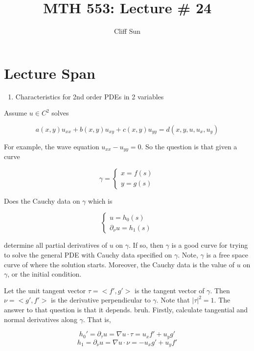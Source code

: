 \documentclass{article}
\title{MTH 553: Lecture \# 24}
\author{Cliff Sun}
\newtheorem{one minute paper}[theorem]{One Minute Paper}
\begin{document}
\maketitle

\section*{Lecture Span}
\begin{enumerate}
    \item Characteristics for 2nd order PDEs in 2 variables
\end{enumerate}

Assume $u \in C^2$ solves 

\begin{equation}
    a(x,y)u_{xx} + b(x,y)u_{xy} + c(x,y)u_{yy} = d(x,y,u,u_x,u_y)
\end{equation}

For example, the wave equation $u_{xx} - u_{yy} = 0$. So the question is that given a curve 

\begin{equation}
    \gamma = \begin{cases}
        x = f(s) \\
        y = g(s)
    \end{cases}
\end{equation}

Does the Cauchy data on $\gamma$ which is 

\begin{equation}
    \begin{cases}
        u = h_0(s) \\
        \partial_{\nu}u = h_1(s)
    \end{cases}
\end{equation}

determine all partial derivatives of $u$ on $\gamma$. If so, then $\gamma$ is a good curve for trying to solve the general PDE with Cauchy data specified on $\gamma$. Note, $\gamma$ is a free space curve of where the solution starts. Moreover, the Cauchy data is the value of $u$ on $\gamma$, or the initial condition. 

Let the unit tangent vector $\tau = <f', g'>$ is the tangent vector of $\gamma$. Then $\nu = <g', f'>$ is the derivative perpendicular to $\gamma$. Note that $|\tau|^2 = 1$.  The answer to that question is that it depends. bruh. Firstly, calculate tangential and normal derivatives along $\gamma$. 
That is, 

\begin{equation}
    h_0' = \partial_{\tau}u = \nabla u \cdot \tau = u_x f' + u_y g'
\end{equation}
\begin{equation}
    h_1 = \partial_{\nu}u = \nabla u \cdot \nu = -u_xg' + u_yf'
\end{equation}
\end{document}
